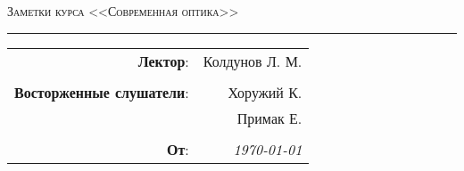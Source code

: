 
\begin{center}
    \LARGE \textsc{Заметки курса <<Современная оптика>>}
\end{center}

\hrule

\phantom{42}

\begin{flushright}
    \begin{tabular}{rr}
        \textbf{Лектор}: 
        & Колдунов Л. М. \\
        &\\
        \textbf{Восторженные слушатели}: 
        & Хоружий К. \\
        & Примак Е. \\
        &\\
        \textbf{От}: &
        \textit{\today}\\
    \end{tabular}
\end{flushright}

\thispagestyle{empty}
\tableofcontents
\newpage